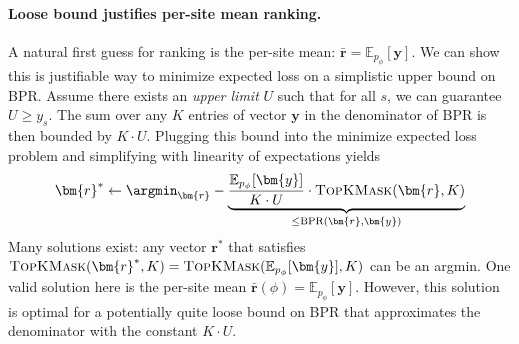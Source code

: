 
\paragraph{Loose bound justifies per-site mean ranking.} A natural first guess for ranking is the per-site mean: $\bm{\bar{r}} = \mathbb{E}_{p_{\phi}}[\bm{y}]$. We can show this is justifiable way to minimize expected loss on a simplistic upper bound on BPR.
Assume there exists an \emph{upper limit} $U$ such that for all $s$, we can guarantee $U \geq y_s$.
The sum over any $K$ entries of vector $\bm{y}$ in the denominator of BPR is then bounded by $K \cdot U$. Plugging this bound into the minimize expected loss problem and simplifying with linearity of expectations yields
\begin{align}
    \bm{r}^* \gets \argmin_{\bm{r}} -
    \underbrace{
    \frac{
    \mathbb{E}_{p_{\phi}} [ \bm{y} ]
    }{
        K \cdot U
    } \cdot \textsc{TopKMask}( \bm{r}, K)
    }_{\leq \text{BPR}(\bm{r}, \bm{y})}
\end{align}
Many solutions exist: any vector $\bm{r}^*$ 
that satisfies $\textsc{TopKMask}(\bm{r}^*, K) = \textsc{TopKMask}(\mathbb{E}_{p_{\phi}}[\bm{y}], K)$ can be an argmin. One valid solution here is the per-site mean $\bm{\bar{r}}(\phi) = \mathbb{E}_{p_{\phi}}[\bm{y}]$. However, this solution is optimal for a potentially quite loose bound on BPR that approximates the denominator with the constant $K \cdot U$.

